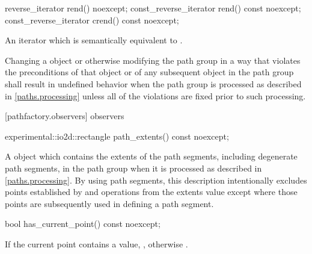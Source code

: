 \begin{itemdecl}
	reverse_iterator rend() noexcept;
	const_reverse_iterator rend() const noexcept;
	const_reverse_iterator crend() const noexcept;
\end{itemdecl}
\begin{itemdescr}
	\pnum
	\returns
	An iterator which is semantically equivalent to .
	
	\pnum
	\remarks
	Changing a  object or otherwise modifying the path group in a way that violates the preconditions of that  object or of any subsequent  object in the path group shall result in undefined behavior when the path group is processed as described in \ref{paths.processing} unless all of the violations are fixed prior to such processing.
\end{itemdescr}

 [pathfactory.observers] { observers}

\begin{itemdecl}
    experimental::io2d::rectangle path_extents() const noexcept;
\end{itemdecl}
\begin{itemdescr}
	\pnum
	\returns
	A  object which contains the extents of the path segments, including degenerate path segments, in the path group when it is processed as described in \ref{paths.processing}.
	\enternote
	By using path segments, this description intentionally excludes points established by  and  operations from the extents value except where those points are subsequently used in defining a path segment.
	\exitnote
\end{itemdescr}

\begin{itemdecl}
    bool has_current_point() const noexcept;
\end{itemdecl}
\begin{itemdescr}
	\pnum
	\returns
	If the current point contains a value, , otherwise .
\end{itemdescr}

